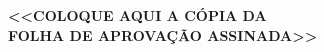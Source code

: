 %
% 
%
\begin{folhadeaprovacao}

\vspace*{\fill}

\begin{center}
\LARGE\textbf{<<COLOQUE AQUI A CÓPIA DA\\FOLHA DE APROVAÇÃO ASSINADA>>}
\end{center}

\vspace*{\fill}
  
\end{folhadeaprovacao}